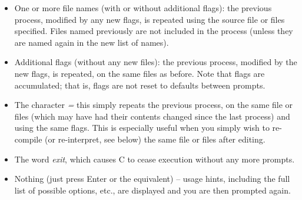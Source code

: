 \begin{itemize}
\item One or more file names (with or without additional flags): the previous
process, modified by any new flags, is repeated using the source file
or files specified.  Files named previously are not included in the
process (unless they are named again in the new list of names).
\item Additional flags (without any new files): the previous process, modified
by the new flags, is repeated, on the same files as before.
Note that flags are accumulated; that is, flags are not reset to
defaults between prompts.
\item The character \emph{=} this simply repeats the previous process,
on the same file or files (which may have had their contents changed
since the last process) and using the same flags.  This is especially
useful when you simply wish to re-compile (or re-interpret, see below)
the same file or files after editing.
\item
{}
The word \emph{exit}, which causes \nr{}C to cease execution
without any more prompts.
\item
Nothing (just press Enter or the equivalent) -- usage hints, including
the full list of possible options, etc., are displayed and you are then
prompted again.
\end{itemize}


